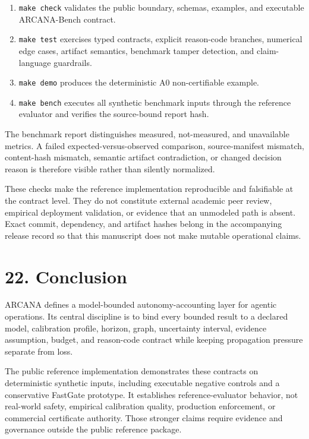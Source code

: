 \documentclass[
  american,
  a4paper,
  10pt]{article}
\providecommand{\tightlist}{%
  \setlength{\itemsep}{0pt}\setlength{\parskip}{0pt}}
\begin{document}
\begin{enumerate}
\def\labelenumi{\arabic{enumi}.}
\tightlist
\item
  \texttt{make\ check} validates the public boundary, schemas, examples, and executable
  ARCANA-Bench contract.
\item
  \texttt{make\ test} exercises typed contracts, explicit reason-code branches,
  numerical edge cases, artifact semantics, benchmark tamper detection, and
  claim-language guardrails.
\item
  \texttt{make\ demo} produces the deterministic A0 non-certifiable example.
\item
  \texttt{make\ bench} executes all synthetic benchmark inputs through the reference
  evaluator and verifies the source-bound report hash.
\end{enumerate}

The benchmark report distinguishes measured, not-measured, and unavailable metrics. A
failed expected-versus-observed comparison, source-manifest mismatch, content-hash
mismatch, semantic artifact contradiction, or changed decision reason is therefore
visible rather than silently normalized.

These checks make the reference implementation reproducible and falsifiable at the
contract level. They do not constitute external academic peer review, empirical
deployment validation, or evidence that an unmodeled path is absent. Exact commit,
dependency, and artifact hashes belong in the accompanying release record so that this
manuscript does not make mutable operational claims.

\section{22. Conclusion}\label{22-conclusion}

ARCANA defines a model-bounded autonomy-accounting layer for agentic operations. Its
central discipline is to bind every bounded result to a declared model, calibration
profile, horizon, graph, uncertainty interval, evidence assumption, budget, and
reason-code contract while keeping propagation pressure separate from loss.

The public reference implementation demonstrates these contracts on deterministic
synthetic inputs, including executable negative controls and a conservative FastGate
prototype. It establishes reference-evaluator behavior, not real-world safety, empirical
calibration quality, production enforcement, or commercial certificate authority. Those
stronger claims require evidence and governance outside the public reference package.
\end{document}

